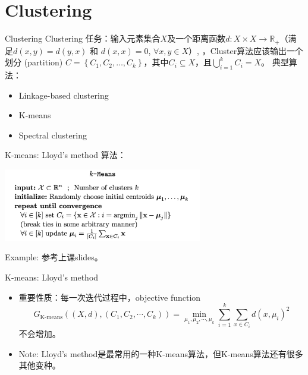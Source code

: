 \section{Clustering}

\begin{frame}{Clustering}
    Clustering 任务：输入元素集合$X$及一个距离函数$d: X\times X \to  \mathbb{R}_+$（满足$d(x, y) = d(y, x)$ 和 $d(x, x) = 0$, $\forall x, y \in X$）, ，Cluster算法应该输出一个划分 (partition) $C = \left\{ C_1, C_2, \ldots, C_k \right\}$，其中$C_i \subseteq X$，且$\bigcup_{i=1}^{k} C_i = X$。
    典型算法：
    \begin{itemize}
        \item Linkage-based clustering
        \item K-means
        \item Spectral clustering
    \end{itemize}
\end{frame}

\begin{frame}{K-means: Lloyd's method}
    算法：
    \begin{center}
        \includegraphics[width=0.65\textwidth]{assets/kmeans.png}
    \end{center}
    Example: 参考上课slides。
\end{frame}

\begin{frame}{K-means: Lloyd's method}
\begin{itemize}
    \item 重要性质：每一次迭代过程中，objective function 
    \[
        G_{\text{K-means}}((X, d), (C_1, C_2, \cdots, C_k)) =\min_{\mu_1, \mu_2, \cdots, \mu_k} \sum_{i=1}^{k} \sum_{x \in C_i} d(x, \mu_i) ^{2}
    \]
    不会增加。
    \item Note: Lloyd's method是最常用的一种K-means算法，但K-means算法还有很多其他变种。
\end{itemize}
\end{frame}

